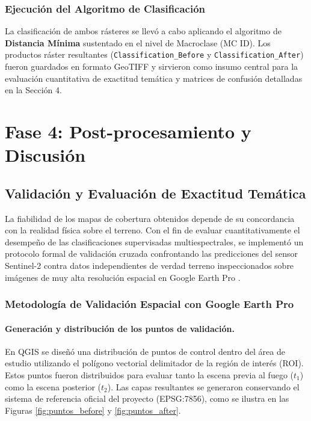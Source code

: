 \documentclass[12pt]{article}
\begin{document}
\subsubsection{Ejecución del Algoritmo de Clasificación}
La clasificación de ambos rásteres se llevó a cabo aplicando el algoritmo de \textbf{Distancia Mínima} sustentado en el nivel de Macroclase (MC ID). Los productos ráster resultantes (\texttt{Classification\_Before} y \texttt{Classification\_After}) fueron guardados en formato GeoTIFF y sirvieron como insumo central para la evaluación cuantitativa de exactitud temática y matrices de confusión detalladas en la Sección 4.
\section{Fase 4: Post-procesamiento y Discusión}

\subsection{Validación y Evaluación de Exactitud Temática}

La fiabilidad de los mapas de cobertura obtenidos depende de su concordancia con la realidad física sobre el terreno. Con el fin de evaluar cuantitativamente el desempeño de las clasificaciones supervisadas multiespectrales, se implementó un protocolo formal de validación cruzada confrontando las predicciones del sensor Sentinel-2 contra datos independientes de verdad terreno inspeccionados sobre imágenes de muy alta resolución espacial en Google Earth Pro \cite{lillesand2015remote}.

\subsubsection{Metodología de Validación Espacial con Google Earth Pro}

\paragraph{Generación y distribución de los puntos de validación.}
En QGIS se diseñó una distribución de puntos de control dentro del área de estudio utilizando el polígono vectorial delimitador de la región de interés (ROI). Estos puntos fueron distribuidos para evaluar tanto la escena previa al fuego ($t_1$) como la escena posterior ($t_2$). Las capas resultantes se generaron conservando el sistema de referencia oficial del proyecto (EPSG:7856), como se ilustra en las Figuras \ref{fig:puntos_before} y \ref{fig:puntos_after}.
\end{document}
